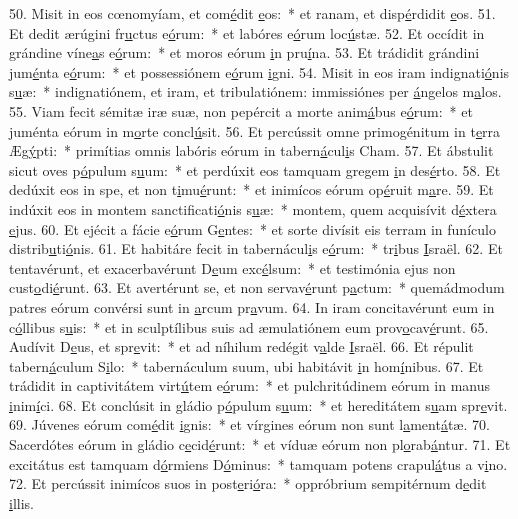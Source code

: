 50. Misit in eos cœnomyíam, et com\uline{é}dit \uline{e}os:~* et ranam, et disp\uline{é}rdidit \uline{e}os.
51. Et dedit ærúgini fr\uline{u}ctus e\uline{ó}rum:~* et labóres e\uline{ó}rum loc\uline{ú}stæ.
52. Et occídit in grándine víne\uline{a}s e\uline{ó}rum:~* et moros eórum \uline{i}n pru\uline{í}na.
53. Et trádidit grándini jum\uline{é}nta e\uline{ó}rum:~* et possessiónem e\uline{ó}rum \uline{i}gni.
54. Misit in eos iram indignati\uline{ó}nis s\uline{u}æ:~* indignatiónem, et iram, et tribulatiónem: immissiónes per \uline{á}ngelos m\uline{a}los.
55. Viam fecit sémitæ iræ suæ, non pepércit a morte anim\uline{á}bus e\uline{ó}rum:~* et juménta eórum in m\uline{o}rte concl\uline{ú}sit.
56. Et percússit omne primogénitum in t\uline{e}rra Æg\uline{ý}pti:~* primítias omnis labóris eórum in tabern\uline{á}cul\uline{i}s Cham.
57. Et ábstulit sicut oves p\uline{ó}pulum s\uline{u}um:~* et perdúxit eos tamquam gregem \uline{i}n des\uline{é}rto.
58. Et dedúxit eos in spe, et non t\uline{i}mu\uline{é}runt:~* et inimícos eórum op\uline{é}ruit m\uline{a}re.
59. Et indúxit eos in montem sanctificati\uline{ó}nis s\uline{u}æ:~* montem, quem acquisívit d\uline{é}xtera \uline{e}jus.
60. Et ejécit a fácie e\uline{ó}rum G\uline{e}ntes:~* et sorte divísit eis terram in funículo distrib\uline{u}ti\uline{ó}nis.
61. Et habitáre fecit in tabernácul\uline{i}s e\uline{ó}rum:~* tr\uline{i}bus \uline{I}sraël.
62. Et tentavérunt, et exacerbavérunt D\uline{e}um exc\uline{é}lsum:~* et testimónia ejus non cust\uline{o}di\uline{é}runt.
63. Et avertérunt se, et non servav\uline{é}runt p\uline{a}ctum:~* quemádmodum patres eórum convérsi sunt in \uline{a}rcum pr\uline{a}vum.
64. In iram concitavérunt eum in c\uline{ó}llibus s\uline{u}is:~* et in sculptílibus suis ad æmulatiónem eum prov\uline{o}cav\uline{é}runt.
65. Audívit D\uline{e}us, et spr\uline{e}vit:~* et ad níhilum redégit v\uline{a}lde \uline{I}sraël.
66. Et répulit tabern\uline{á}culum S\uline{i}lo:~* tabernáculum suum, ubi habitávit \uline{i}n hom\uline{í}nibus.
67. Et trádidit in captivitátem virt\uline{ú}tem e\uline{ó}rum:~* et pulchritúdinem eórum in manus \uline{i}nim\uline{í}ci.
68. Et conclúsit in gládio p\uline{ó}pulum s\uline{u}um:~* et hereditátem s\uline{u}am spr\uline{e}vit.
69. Júvenes eórum com\uline{é}dit \uline{i}gnis:~* et vírgines eórum non sunt l\uline{a}ment\uline{á}tæ.
70. Sacerdótes eórum in gládio c\uline{e}cid\uline{é}runt:~* et víduæ eórum non pl\uline{o}rab\uline{á}ntur.
71. Et excitátus est tamquam d\uline{ó}rmiens D\uline{ó}minus:~* tamquam potens crapul\uline{á}tus a v\uline{i}no.
72. Et percússit inimícos suos in post\uline{e}ri\uline{ó}ra:~* oppróbrium sempitérnum d\uline{e}dit \uline{i}llis.
